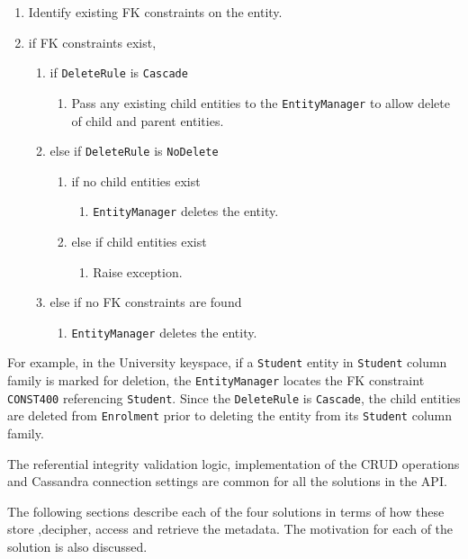 \begin{description}
		\begin{enumerate}
		  \item Identify existing \ac{FK} constraints on the entity.
		  \item if \ac{FK} constraints exist,
		  		\begin{enumerate}
		  		  \item if \texttt{DeleteRule} is \texttt{Cascade}
		  		 		\begin{enumerate}
		  		 		   \item Pass any existing child entities to the \texttt{EntityManager}
		  		 		   to allow delete of child  and parent entities.
		  		 		\end{enumerate}
		  		  \item else if \texttt{DeleteRule}  is \texttt{NoDelete}
						\begin{enumerate}
						  \item if no child entities exist
						  		\begin{enumerate}
						  		  \item \texttt{EntityManager} deletes the entity.
						  		\end{enumerate}
						  \item else if child entities exist
						   		\begin{enumerate}
						    		\item Raise exception. 
						    	\end{enumerate}
						\end{enumerate}
						
				  \item else if no \ac{FK} constraints are found 
				  		\begin{enumerate}
				  		  \item \texttt{EntityManager} deletes the entity.
						\end{enumerate}
		  		\end{enumerate}
		\end{enumerate}	
		For example,  in the University keyspace,  if a 
		\texttt{Student} entity in \texttt{Student} column family is marked for
		deletion, the \texttt{EntityManager} locates the \ac{FK} constraint 
		\texttt{CONST400} referencing \texttt{Student}.
		Since the \texttt{DeleteRule} is \texttt{Cascade}, 
		the child entities are deleted from \texttt{Enrolment} prior to deleting the
		entity from its \texttt{Student} column family. 
		\end{description}
		
% 		
% 		
		The referential integrity validation logic, implementation of the \ac{CRUD}
		operations and Cassandra connection settings are common for all the solutions
		in the \ac{API}.
		
		The following sections describe each of the four solutions in terms of how
		these store ,decipher, access and retrieve the metadata. The motivation for
		each of the solution is also discussed. 

